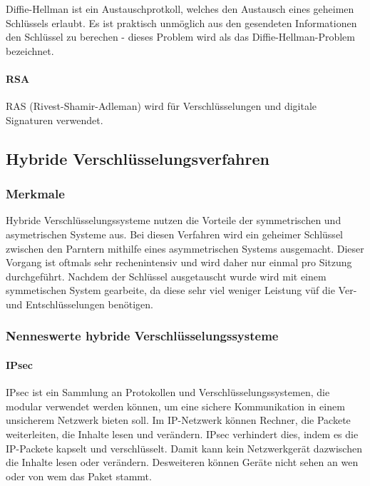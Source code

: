 \documentclass[12pt,a4paper]{report}
\begin{document}
\begin{onehalfspace}
Diffie-Hellman ist ein Austauschprotkoll, welches den Austausch eines geheimen Schlüssels erlaubt. Es ist praktisch unmöglich aus den gesendeten Informationen den Schlüssel zu berechen - dieses Problem wird als das Diffie-Hellman-Problem bezeichnet.

\paragraph{RSA}

RAS (Rivest-Shamir-Adleman) wird für Verschlüsselungen und digitale Signaturen verwendet.

\subsection{Hybride Verschlüsselungsverfahren}

\subsubsection{Merkmale}

Hybride Verschlüsselungssysteme nutzen die Vorteile der symmetrischen und asymetrischen Systeme aus. Bei diesen Verfahren wird ein geheimer Schlüssel zwischen den Parntern mithilfe eines asymmetrischen Systems ausgemacht. Dieser Vorgang ist oftmals sehr rechenintensiv und wird daher nur einmal pro Sitzung durchgeführt. Nachdem der Schlüssel ausgetauscht wurde wird mit einem symmetischen System gearbeite, da diese sehr viel weniger Leistung vüf die Ver- und Entschlüsselungen benötigen.

\subsubsection{Nenneswerte hybride Verschlüsselungssysteme}

\paragraph{IPsec}

IPsec ist ein Sammlung an Protokollen und Verschlüsselungssystemen, die modular verwendet werden können, um eine sichere Kommunikation in einem unsicherem Netzwerk bieten soll. Im IP-Netzwerk können Rechner, die Packete weiterleiten, die Inhalte lesen und verändern. IPsec verhindert dies, indem es die IP-Packete kapselt und verschlüsselt. Damit kann kein Netzwerkgerät dazwischen die Inhalte lesen oder verändern. Desweiteren können Geräte nicht sehen an wen oder von wem das Paket stammt.


\end{onehalfspace}
\end{document}
